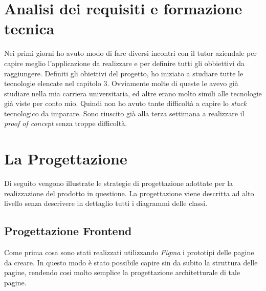 \section{Analisi dei requisiti e formazione tecnica}
Nei primi giorni ho avuto modo di fare diversi incontri con il tutor aziendale per capire meglio l'applicazione da realizzare e per definire tutti gli obbiettivi da raggiungere. 
Definiti gli obiettivi del progetto, ho iniziato a studiare tutte le tecnologie elencate nel capitolo 3. Ovviamente molte di queste le avevo già studiare nella mia carriera universitaria, ed altre erano molto simili alle tecnologie già viste per conto mio. Quindi non ho avuto tante difficoltà a capire lo \emph{stack} tecnologico da imparare.
 Sono riuscito già alla terza settimana a realizzare il \emph{proof of concept} senza troppe difficoltà.
 \newpage  
\section{La Progettazione}

Di seguito vengono illustrate le strategie di progettazione adottate per la realizzazione del prodotto in questione. La progettazione viene descritta ad alto livello senza descrivere in dettaglio tutti i diagrammi delle classi.
\subsection{Progettazione Frontend}
\label{sec:progettazione}
Come prima cosa sono stati realizzati utilizzando \emph{Figma} i prototipi delle pagine da creare. In questo modo è stato possibile capire sin da subito la struttura delle pagine, rendendo cosi molto semplice la progettazione architetturale di tale pagine.
